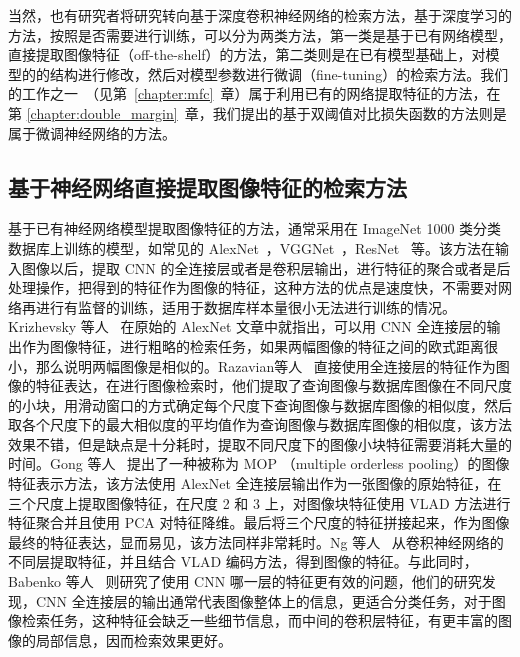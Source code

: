 当然，也有研究者将研究转向基于深度卷积神经网络的检索方法，基于深度学习的方法，按照是否需要进行训练，可以分为两类方法，第一类是基于已有网络模型，直接提取图像特征（off-the-shelf）的方法，第二类则是在已有模型基础上，对模型的的结构进行修改，然后对模型参数进行微调（fine-tuning）的检索方法。我们的工作之一~\cite{Hao2017MFCAM}（见第~\ref{chapter:mfc}~章）属于利用已有的网络提取特征的方法，在第 \ref{chapter:double_margin}~章，我们提出的基于双阈值对比损失函数的方法则是属于微调神经网络的方法。

\subsection{基于神经网络直接提取图像特征的检索方法}

基于已有神经网络模型提取图像特征的方法，通常采用在 ImageNet 1000 类分类数据库上训练的模型，如常见的 AlexNet~\cite{Krizhevsky2012ImageNetCW}，VGGNet~\cite{Simonyan2014VeryDC}，ResNet~\cite{He2016DeepRL} 等。该方法在输入图像以后，提取 CNN 的全连接层或者是卷积层输出，进行特征的聚合或者是后处理操作，把得到的特征作为图像的特征，这种方法的优点是速度快，不需要对网络再进行有监督的训练，适用于数据库样本量很小无法进行训练的情况。Krizhevsky 等人~\cite{Krizhevsky2012ImageNetCW} 在原始的 AlexNet 文章中就指出，可以用 CNN 全连接层的输出作为图像特征，进行粗略的检索任务，如果两幅图像的特征之间的欧式距离很小，那么说明两幅图像是相似的。Razavian等人~\cite{Razavian2014CNNFO} 直接使用全连接层的特征作为图像的特征表达，在进行图像检索时，他们提取了查询图像与数据库图像在不同尺度的小块，用滑动窗口的方式确定每个尺度下查询图像与数据库图像的相似度，然后取各个尺度下的最大相似度的平均值作为查询图像与数据库图像的相似度，该方法效果不错，但是缺点是十分耗时，提取不同尺度下的图像小块特征需要消耗大量的时间。Gong 等人~\cite{Gong2014MultiscaleOP} 提出了一种被称为 MOP （multiple orderless pooling）的图像特征表示方法，该方法使用 AlexNet 全连接层输出作为一张图像的原始特征，在三个尺度上提取图像特征，在尺度 2 和 3 上，对图像块特征使用 VLAD 方法进行特征聚合并且使用 PCA 对特征降维。最后将三个尺度的特征拼接起来，作为图像最终的特征表达，显而易见，该方法同样非常耗时。Ng 等人~\cite{Ng2015ExploitingLF} 从卷积神经网络的不同层提取特征，并且结合 VLAD 编码方法，得到图像的特征。与此同时，Babenko 等人~\cite{Babenko2014NeuralCF} 则研究了使用 CNN 哪一层的特征更有效的问题，他们的研究发现，CNN 全连接层的输出通常代表图像整体上的信息，更适合分类任务，对于图像检索任务，这种特征会缺乏一些细节信息，而中间的卷积层特征，有更丰富的图像的局部信息，因而检索效果更好。

